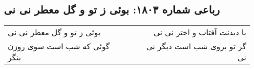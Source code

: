 \begin{center}
\section*{رباعی شماره ۱۸۰۳: بوئی ز تو و گل معطر نی نی}
\label{sec:1803}
\begin{longtable}{l p{0.5cm} r}
بوئی ز تو و گل معطر نی نی
&&
با دیدنت آفتاب و اختر نی نی
\\
گوئی که شب است سوی روزن بنگر
&&
گر تو بروی شب است دیگر نی نی
\\
\end{longtable}
\end{center}
